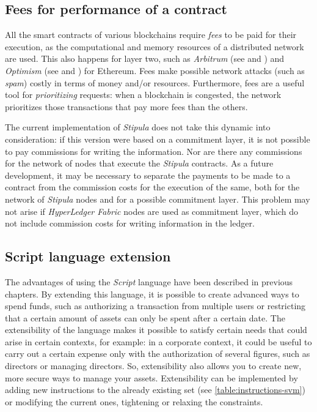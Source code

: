 \subsection{Fees for performance of a contract}

All the smart contracts of various blockchains require \textit{fees} to be paid for their execution, 
as the computational and memory resources of a distributed network are used. This also happens for layer two, 
such as \textit{Arbitrum} (see \cite{site:arbitrum} and \cite{site:arbitrum-fees}) and \textit{Optimism} 
(see \cite{site:optimism} and \cite{site:optimism-fees}) for Ethereum. Fees make possible network attacks 
(such as \textit{spam}) costly in terms of money and/or resources. Furthermore, fees are a useful tool for 
\textit{prioritizing} requests: when a blockchain is congested, the network prioritizes those transactions 
that pay more fees than the others.

The current implementation of \textit{Stipula} does not take this dynamic into consideration: if this 
version were based on a commitment layer, it is not possible to pay commissions for writing the information. 
Nor are there any commissions for the network of nodes that execute the \textit{Stipula} contracts. As a 
future development, it may be necessary to separate the payments to be made to a contract from the 
commission costs for the execution of the same, both for the network of \textit{Stipula} nodes and for a 
possible commitment layer. This problem may not arise if \textit{HyperLedger Fabric} nodes are used as 
commitment layer, which do not include commission costs for writing information in the ledger.

\subsection{Script language extension}

The advantages of using the \textit{Script} language have been described in previous chapters. By extending 
this language, it is possible to create advanced ways to spend funds, such as authorizing a transaction from 
multiple users or restricting that a certain amount of assets can only be spent after a certain date. The 
extensibility of the language makes it possible to satisfy certain needs that could arise in certain 
contexts, for example: in a corporate context, it could be useful to carry out a certain expense only with 
the authorization of several figures, such as directors or managing directors. So, extensibility also allows 
you to create new, more secure ways to manage your assets. Extensibility can be implemented by adding new 
instructions to the already existing set (see \ref{table:instructions-svm}) or modifying the current ones, 
tightening or relaxing the constraints.

